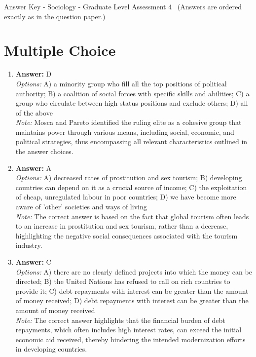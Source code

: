 \documentclass[12pt]{article}
\begin{document}
\begin{center}
Answer Key - Sociology - Graduate Level Assessment 4 \
\small (Answers are ordered exactly as in the question paper.)
\end{center}

\section*{Multiple Choice}
\begin{enumerate}[label=\arabic*.]
\item \textbf{Answer:} D
\\ \textit{Options:} A) a minority group who fill all the top positions of political authority; B) a coalition of social forces with specific skills and abilities; C) a group who circulate between high status positions and exclude others; D) all of the above
\\ \textit{Note:} Mosca and Pareto identified the ruling elite as a cohesive group that maintains power through various means, including social, economic, and political strategies, thus encompassing all relevant characteristics outlined in the answer choices.
\item \textbf{Answer:} A
\\ \textit{Options:} A) decreased rates of prostitution and sex tourism; B) developing countries can depend on it as a crucial source of income; C) the exploitation of cheap, unregulated labour in poor countries; D) we have become more aware of 'other' societies and ways of living
\\ \textit{Note:} The correct answer is based on the fact that global tourism often leads to an increase in prostitution and sex tourism, rather than a decrease, highlighting the negative social consequences associated with the tourism industry.
\item \textbf{Answer:} C
\\ \textit{Options:} A) there are no clearly defined projects into which the money can be directed; B) the United Nations has refused to call on rich countries to provide it; C) debt repayments with interest can be greater than the amount of money received; D) debt repayments with interest can be greater than the amount of money received
\\ \textit{Note:} The correct answer highlights that the financial burden of debt repayments, which often includes high interest rates, can exceed the initial economic aid received, thereby hindering the intended modernization efforts in developing countries.

\end{enumerate}
\end{document}
